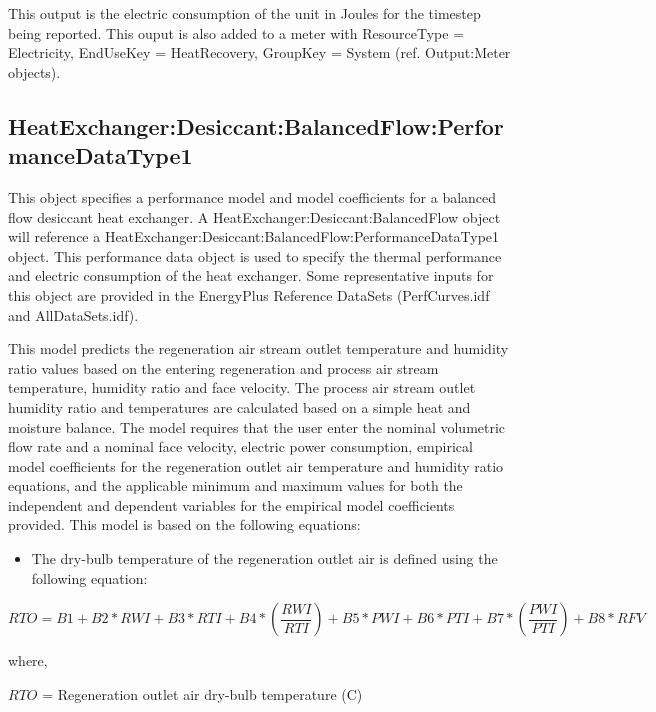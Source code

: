 This output is the electric consumption of the unit in Joules for the timestep being reported. This ouput is also added to a meter with ResourceType = Electricity, EndUseKey = HeatRecovery, GroupKey = System (ref. Output:Meter objects).

\subsection{HeatExchanger:Desiccant:BalancedFlow:PerformanceDataType1}\label{heatexchangerdesiccantbalancedflowperformancedatatype1}

This object specifies a performance model and model coefficients for a balanced flow desiccant heat exchanger. A HeatExchanger:Desiccant:BalancedFlow object will reference a HeatExchanger:Desiccant:BalancedFlow:PerformanceDataType1 object. This performance data object is used to specify the thermal performance and electric consumption of the heat exchanger. Some representative inputs for this object are provided in the EnergyPlus Reference DataSets (PerfCurves.idf and AllDataSets.idf).

This model predicts the regeneration air stream outlet temperature and humidity ratio values based on the entering regeneration and process air stream temperature, humidity ratio and face velocity. The process air stream outlet humidity ratio and temperatures are calculated based on a simple heat and moisture balance. The model requires that the user enter the nominal volumetric flow rate and a nominal face velocity, electric power consumption, empirical model coefficients for the regeneration outlet air temperature and humidity ratio equations, and the applicable minimum and maximum values for both the independent and dependent variables for the empirical model coefficients provided. This model is based on the following equations:

\begin{itemize}
\tightlist
\item
  The dry-bulb temperature of the regeneration outlet air is defined using the following equation:
\end{itemize}

\begin{equation}
RTO = B1 + B2*RWI + B3*RTI + B4*\left( {\frac{{RWI}}{{RTI}}} \right) + B5*PWI + B6*PTI + B7*\left( {\frac{{PWI}}{{PTI}}} \right) + B8*RFV
\end{equation}

where,

\(RTO\) = Regeneration outlet air dry-bulb temperature (C)

